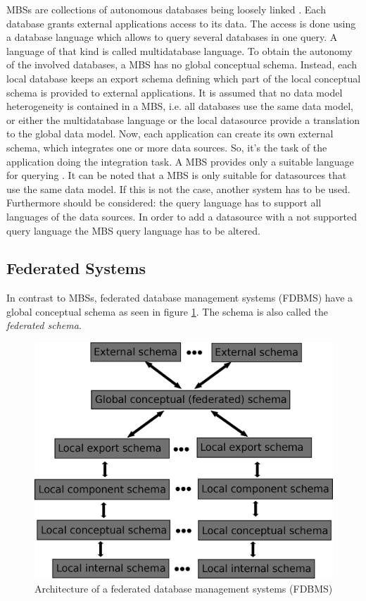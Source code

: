 MBSs are collections of autonomous databases being loosely linked \cite[p. 93]{DBLP:books/dp/LeserN2006}. Each database grants external applications access to its data. The access is done using a database language which allows to query several databases in one query. 
A language of that kind is called multidatabase language. To obtain the autonomy  of the involved databases, a MBS has no global conceptual schema. Instead, each local database keeps an export schema defining which part of the local conceptual schema is provided to external applications.  
It is assumed that no data model heterogeneity is contained in a MBS, i.e. all databases use the same data model, or either the multidatabase language or the local datasource provide a translation to the global data model. Now, each application can create its own external schema, which integrates one or more data sources. So, it's the task of the application doing the integration task. A MBS provides only a suitable language for querying \cite[p. 94]{DBLP:books/dp/LeserN2006}.	
It can be noted that a MBS is only suitable for datasources that use the same data model. If this is not the case, another system has to be used. Furthermore should be considered: the query language has to support all languages of the data sources. In order to add a datasource with a not supported query language the MBS query language has to be altered. 

\subsection{Federated Systems}

In contrast to MBSs, federated database management systems (FDBMS) have a global conceptual schema as seen in figure \ref{FDBMSArchitecture}. The schema is also called the \emph{federated schema}.

\begin{figure}[H]
	\begin{center}
		\includegraphics[scale=0.5]{figures/federatedDatabaseArchitecture.png}
	\end{center}
	\caption{Architecture of a  federated database management systems (FDBMS) \cite[p. 95]{DBLP:books/dp/LeserN2006}}
	\label{FDBMSArchitecture}
\end{figure}

